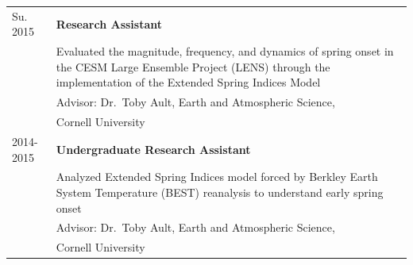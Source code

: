 \documentclass[margin,line,palatino,courier,10pt]{res}
\begin{document}
\begin{resume}
\begin{tabular}{@{}p{0.9in}p{4in}}
Su. 2015 & \textbf{Research Assistant}\\
& Evaluated the magnitude, frequency, and dynamics of spring onset in the CESM Large Ensemble Project (LENS) through the implementation of the Extended Spring Indices Model \\
& \hspace{0.2in} Advisor: Dr.\ Toby Ault, Earth and Atmospheric Science,\\
& \vspace{-0.18in}\hspace{0.2in} Cornell University\\

2014-2015 & \textbf{Undergraduate Research Assistant}\\
& Analyzed Extended Spring Indices model forced by Berkley Earth System Temperature (BEST) reanalysis to understand early spring onset\\
& \hspace{0.2in} Advisor: Dr.\ Toby Ault, Earth and Atmospheric Science, \\
& \vspace{-0.18in}\hspace{0.2in} Cornell University\\
\end{tabular}

\vspace{-0.1in}
\noindent\textcolor{Cerulean}{\makebox[\linewidth][r]{\rule{\textwidth}{5pt}}}
\vspace{-0.3in}

\newpage

\end{resume}
\end{document}
